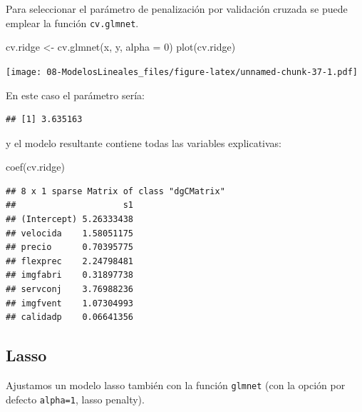 \documentclass[
]{book}
\newenvironment{Shaded}{\begin{snugshade}}{\end{snugshade}}
\newcommand{\AttributeTok}[1]{\textcolor[rgb]{0.77,0.63,0.00}{#1}}
\newcommand{\DecValTok}[1]{\textcolor[rgb]{0.00,0.00,0.81}{#1}}
\newcommand{\FloatTok}[1]{\textcolor[rgb]{0.00,0.00,0.81}{#1}}
\newcommand{\FunctionTok}[1]{\textcolor[rgb]{0.00,0.00,0.00}{#1}}
\newcommand{\NormalTok}[1]{#1}
\newcommand{\OtherTok}[1]{\textcolor[rgb]{0.56,0.35,0.01}{#1}}
\newcommand{\SpecialCharTok}[1]{\textcolor[rgb]{0.00,0.00,0.00}{#1}}
\theoremstyle{break}
\begin{document}
Para seleccionar el parámetro de penalización por validación cruzada se puede emplear
la función \texttt{cv.glmnet}.

\begin{Shaded}
\begin{Highlighting}[]
\NormalTok{cv.ridge }\OtherTok{\textless{}{-}} \FunctionTok{cv.glmnet}\NormalTok{(x, y, }\AttributeTok{alpha =} \DecValTok{0}\NormalTok{)}
\FunctionTok{plot}\NormalTok{(cv.ridge)}
\end{Highlighting}
\end{Shaded}

\texttt{[image: 08-ModelosLineales\_files/figure-latex/unnamed-chunk-37-1.pdf]}

En este caso el parámetro sería:

\begin{Shaded}
\end{Shaded}

\begin{verbatim}
## [1] 3.635163
\end{verbatim}

y el modelo resultante contiene todas las variables explicativas:

\begin{Shaded}
\begin{Highlighting}[]
\FunctionTok{coef}\NormalTok{(cv.ridge)}
\end{Highlighting}
\end{Shaded}

\begin{verbatim}
## 8 x 1 sparse Matrix of class "dgCMatrix"
##                     s1
## (Intercept) 5.26333438
## velocida    1.58051175
## precio      0.70395775
## flexprec    2.24798481
## imgfabri    0.31897738
## servconj    3.76988236
## imgfvent    1.07304993
## calidadp    0.06641356
\end{verbatim}

\hypertarget{lasso}{%
\subsection{Lasso}\label{lasso}}

Ajustamos un modelo lasso también con la función \texttt{glmnet} (con la opción por defecto \texttt{alpha=1}, lasso penalty).
\end{document}
